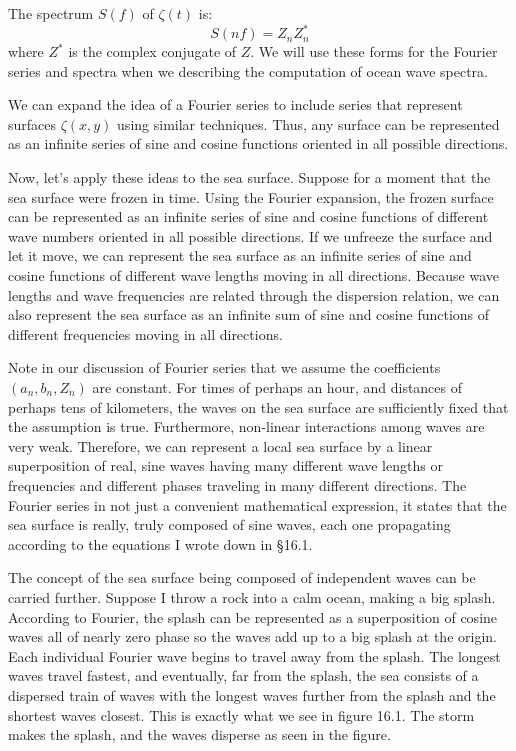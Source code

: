 The spectrum $S(f)$ of $\zeta (t)$ is:
\begin{equation}
S(nf) = Z_n Z^*_n
\end{equation}
where $Z^*$ is the complex conjugate of $Z$. We will use these forms
for the Fourier series and spectra when we describing the computation
of ocean wave spectra.

We can expand the idea of a Fourier series to include series that
represent surfaces $\zeta (x,y)$ using similar techniques. Thus, any
surface can be represented as an infinite series of sine and cosine
functions oriented in all possible directions.

Now, let's apply these ideas to the sea surface. Suppose for a moment
that the sea surface were frozen in time. Using the Fourier expansion,
the frozen surface can be represented as an infinite series of sine
and cosine functions of different wave numbers oriented in all
possible directions. If we unfreeze the surface and let it move, we
can represent the sea surface as an infinite series of sine and cosine
functions of different wave lengths moving in all directions. Because
wave lengths and wave frequencies are related through the dispersion
relation, we can also represent the sea surface as an infinite sum of
sine and cosine functions of different frequencies moving in all
directions.

Note in our discussion of Fourier series that we assume the
coefficients $(a_n, b_n, Z_n)$ are constant. For times of perhaps an
hour, and distances of perhaps tens of kilometers, the waves on the
sea surface are sufficiently fixed that the assumption is
true. Furthermore, non-linear interactions among waves are very
weak. Therefore, we can represent a local sea surface by a linear
superposition of real, sine waves having many different wave lengths
or frequencies and different phases traveling in many different
directions. The Fourier series in not just a convenient mathematical
expression, it states that the sea surface is really, truly composed
of sine waves, each one propagating according to the equations I wrote
down in \S 16.1.

The concept of the sea surface being composed of independent waves can
be carried further. Suppose I throw a rock into a calm ocean, making a
big splash. According to Fourier, the splash can be represented as a
superposition of cosine waves all of nearly zero phase so the waves
add up to a big splash at the origin. Each individual Fourier wave
begins to travel away from the splash. The longest waves travel
fastest, and eventually, far from the splash, the sea consists of a
dispersed train of waves with the longest waves further from the
splash and the shortest waves closest. This is exactly what we see in
figure 16.1. The storm makes the splash, and the waves disperse as
seen in the figure.

